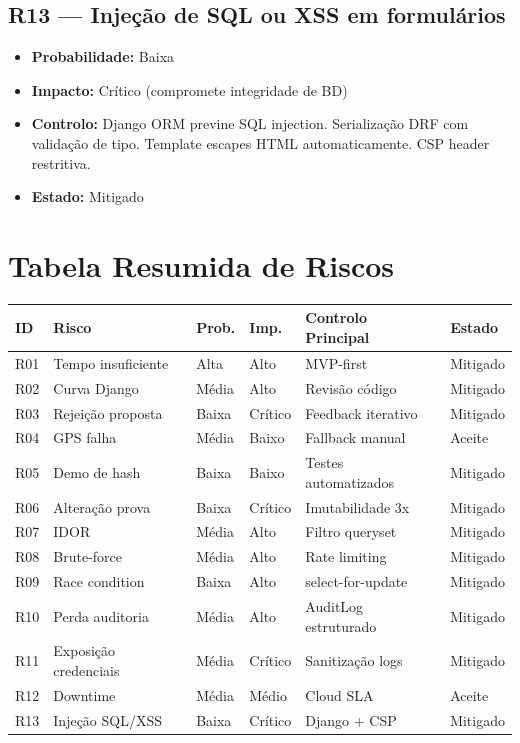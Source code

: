 \documentclass[a4paper,11pt]{article}
\begin{document}
\subsection*{R13 — Injeção de SQL ou XSS em formulários}

\begin{itemize}[nosep]
    \item \textbf{Probabilidade:} Baixa
    \item \textbf{Impacto:} Crítico (compromete integridade de BD)
    \item \textbf{Controlo:} Django ORM previne SQL injection. Serialização DRF
          com validação de tipo. Template escapes HTML automaticamente. CSP header
          restritiva.
    \item \textbf{Estado:} Mitigado
\end{itemize}

\section{Tabela Resumida de Riscos}

\begin{longtable}{L{0.7cm} L{4cm} L{1.2cm} L{1.2cm} L{3.5cm} L{1.2cm}}
    \toprule
    \textbf{ID} & \textbf{Risco} & \textbf{Prob.} & \textbf{Imp.} & \textbf{Controlo Principal} & \textbf{Estado} \\
    \midrule
    \endhead
    R01 & Tempo insuficiente & Alta & Alto & MVP-first & Mitigado \\
    R02 & Curva Django & Média & Alto & Revisão código & Mitigado \\
    R03 & Rejeição proposta & Baixa & Crítico & Feedback iterativo & Mitigado \\
    R04 & GPS falha & Média & Baixo & Fallback manual & Aceite \\
    R05 & Demo de hash & Baixa & Baixo & Testes automatizados & Mitigado \\
    R06 & Alteração prova & Baixa & Crítico & Imutabilidade 3x & Mitigado \\
    R07 & IDOR & Média & Alto & Filtro queryset & Mitigado \\
    R08 & Brute-force & Média & Alto & Rate limiting & Mitigado \\
    R09 & Race condition & Baixa & Alto & select-for-update & Mitigado \\
    R10 & Perda auditoria & Média & Alto & AuditLog estruturado & Mitigado \\
    R11 & Exposição credenciais & Média & Crítico & Sanitização logs & Mitigado \\
    R12 & Downtime & Média & Médio & Cloud SLA & Aceite \\
    R13 & Injeção SQL/XSS & Baixa & Crítico & Django + CSP & Mitigado \\
    \bottomrule
\end{longtable}
\end{document}
